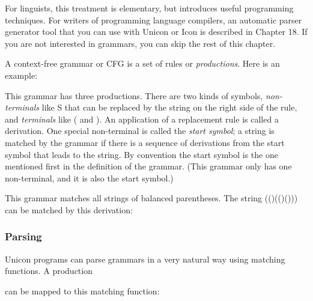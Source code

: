 For linguists, this treatment is elementary, but introduces useful
programming techniques. For writers of programming language compilers,
an automatic parser generator tool that you can use with Unicon or Icon
is described in Chapter 18. If you are not interested in grammars, you
can skip the rest of this chapter.

A context-free grammar or CFG is a set of
rules or \textit{productions}. Here is an example:


This grammar has three productions. There are two kinds of symbols,
\textit{non-terminals} like \textsf{S} that can be replaced by the
string on the right side of the rule, and \textit{terminals} like
\textsf{(} and \textsf{)}. An application of a replacement rule is called
a derivation. One special non-terminal is called the
\textit{start symbol}; a string is matched by the grammar if there is a
sequence of derivations from the start symbol that leads to the string.
By convention the start symbol is the one mentioned first in the
definition of the grammar. (This grammar only has one non-terminal, and
it is also the start symbol.)

This grammar matches all strings of balanced parentheses. The string
\textsf{(()(()()))} can be matched by this derivation:


\subsubsection{Parsing}

Unicon programs can parse grammars in a very natural way using matching
functions. A production


can be mapped to this matching function:


